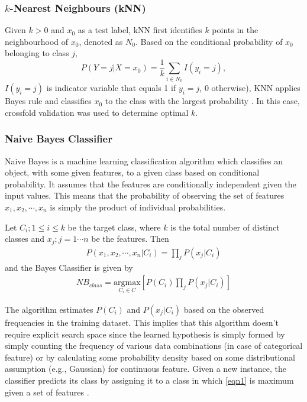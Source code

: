 \subsubsection{$k$-Nearest Neighbours (kNN)}

Given $k>0$ and $x_0$ as a test label, kNN first identifies $k$ points in the neighbourhood of $x_0$, denoted as $\mathit{N}_0$. Based on the conditional probability of $x_0$ belonging to class $j$, 
\[
P(Y = j|X = x_0) = \frac{1}{k}\sum_{i\in \mathit{N}_0}I(y_i=j),
\]
$I(y_i=j)$ is indicator variable that equals 1 if $y_i=j$, 0 otherwise), KNN applies Bayes rule and classifies $x_0$ to the class with the largest probability \citep{trevor2009elements}. In this case, crossfold validation was used to determine optimal $k$.

\subsubsection{Naive Bayes Classifier}

Naive Bayes is a machine learning classification algorithm which classifies an object, with some given features, to a given class based on conditional probability. It assumes that the features are conditionally independent given the input values. This means that the probability of observing the set of features $x_1, x_2, \cdots, x_n$ is simply the product of individual probabilities.

\noindent Let $C_i; 1\leq i \leq k$ be the target class, where $k$ is the total number of distinct classes and $x_j; j=1\cdots n$ be the features. Then 
\begin{align*}
P(x_1, x_2, \cdots, x_n|C_i) = \prod_j{P(x_j|C_i)}
\end{align*}
and the Bayes Classifier is given by
\begin{align}
NB_{class} =  \underset{C_i\in C}{\mathrm{argmax }}\left[ P(C_i) \prod_j{P(x_j|C_i)}\right] \label{eqn1}
\end{align}

\noindent The algorithm estimates $P(C_i)$ and $P(x_j|C_i)$ based on the observed frequencies in the training dataset. This implies that this algorithm doesn't require explicit search space since the learned hypothesis is simply formed by simply counting the frequency of various data combinations (in case of categorical feature) or by calculating some probability density based on some distributional assumption (e.g., Gaussian) for continuous feature. Given a new instance, the classifier predicts its class by assigning it to a class in which \autoref{eqn1} is maximum given a set of features \citep{mitchell1990machine}.

